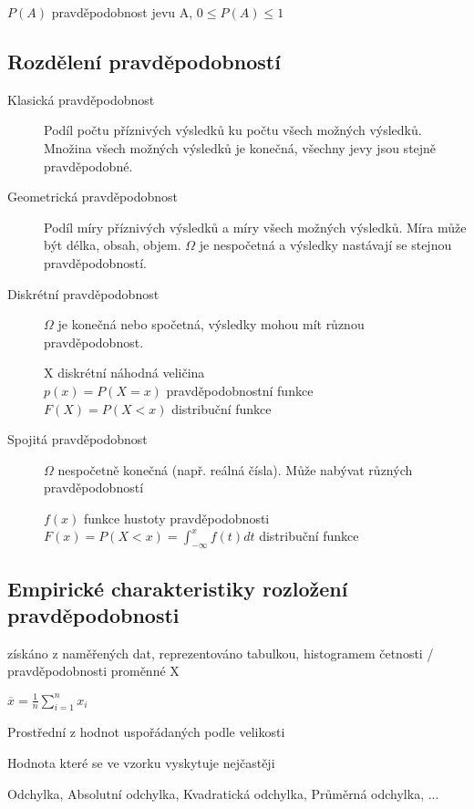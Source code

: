 \documentclass[a4paper, 11pt]{report}
\begin{document}
$P(A)$ pravděpodobnost jevu A, $0 \leq P(A) \leq 1$

\subsection{Rozdělení pravděpodobností}
\begin{description}
	\item[Klasická pravděpodobnost] Podíl počtu příznivých výsledků ku počtu všech možných výsledků. Množina všech možných výsledků je konečná, všechny jevy jsou stejně pravděpodobné.
	\item[Geometrická pravděpodobnost] Podíl míry příznivých výsledků a míry všech možných výsledků. Míra může být délka, obsah, objem. $\Omega$ je nespočetná a výsledky nastávají se stejnou pravděpodobností.
	\item[Diskrétní pravděpodobnost] $\Omega$ je konečná nebo spočetná, výsledky mohou mít různou pravděpodobnost.
	
	X diskrétní náhodná veličina \\
	$p(x) = P(X=x)$ pravděpodobnostní funkce\\
	$F(X) = P(X < x)$ distribuční funkce
	
	\item[Spojitá pravděpodobnost] $\Omega$ nespočetně konečná (např. reálná čísla). Může nabývat různých pravděpodobností
	
	$f(x)$ funkce hustoty pravděpodobnosti\\
	$F(x) = P(X < x) = \int_{-\infty}^x f(t) dt$ distribuční funkce
\end{description}

\subsection{Empirické charakteristiky rozložení pravděpodobnosti}
získáno z naměřených dat, reprezentováno tabulkou, histogramem četnosti / pravděpodobnosti proměnné X

\begin{description}
	\item[Průměr] $\overline{x} = \frac{1}{n} \sum_{i=1}^n x_i$
	\item[Medián] Prostřední z hodnot uspořádaných podle velikosti
	\item[Modus] Hodnota které se ve vzorku vyskytuje nejčastěji
	\item Odchylka, Absolutní odchylka, Kvadratická odchylka, Průměrná odchylka, ...
\end{description}
\end{document}
